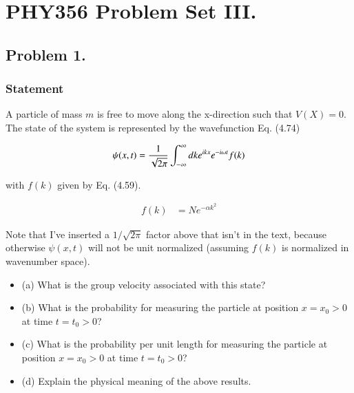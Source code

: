 %
%
%
%
%

\chapter{PHY356 Problem Set III.}
\label{chap:qmIproblemSet3}
{}
\date{Oct 23, 2010}

\beginArtNoToc
\section{Problem 1.}
\subsection{Statement}

A particle of mass $m$ is free to move along the x-direction such that $V(X)=0$. The state of the system is represented by the wavefunction Eq. (4.74)

\begin{align}\label{eqn:qmIproblemSet3:1}
\psi(x,t) = \frac{1}{\sqrt{2\pi}} \int_{-\infty}^\infty dk e^{i k x} e^{- i \omega t} f(k)
\end{align}

with $f(k)$ given by Eq. (4.59).

\begin{align}\label{eqn:qmIproblemSet3:2}
f(k) &= N e^{-\alpha k^2}
\end{align}

Note that I've inserted a $1/\sqrt{2\pi}$ factor above that isn't in the text, because otherwise $\psi(x,t)$ will not be unit normalized (assuming $f(k)$ is normalized in wavenumber space).

\begin{itemize}
\item 
(a) What is the group velocity associated with this state? 
\item 
(b) What is the probability for measuring the particle at position $x=x_0>0$ at time $t=t_0>0$? 
\item 
(c) What is the probability per unit length for measuring the particle at position $x=x_0>0$ at time $t=t_0>0$? 
\item 
(d) Explain the physical meaning of the above results.
\end{itemize}

